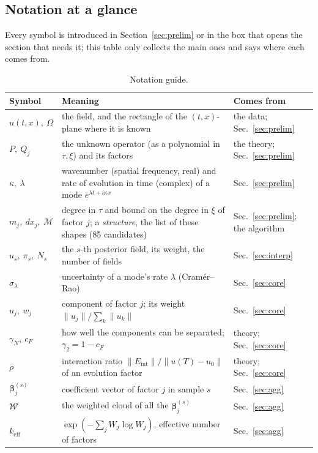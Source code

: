 \documentclass[11pt,a4paper]{article}
\theoremstyle{definition}
\newcommand{\Eint}{E_{\mathrm{int}}}
\newcommand{\bs}{\boldsymbol}
\begin{document}
\subsection{Notation at a glance}
Every symbol is introduced in Section~\ref{sec:prelim} or in the box that opens the section that needs it; this table only collects the main ones and says where each comes from.
\begin{table}[!htb]
\centering\small
\begin{tabular}{@{}L{2.9cm}L{7.0cm}L{3.0cm}@{}}
\toprule
Symbol & Meaning & Comes from\\\midrule
$u(t,x),\ \Omega$ & the field, and the rectangle of the $(t,x)$-plane where it is known & the data; Sec.~\ref{sec:prelim}\\
$P,\ Q_j$ & the unknown operator (as a polynomial in $\tau,\xi$) and its factors & the theory; Sec.~\ref{sec:prelim}\\
$\kappa,\ \lambda$ & wavenumber (spatial frequency, real) and rate of evolution in time (complex) of a mode $e^{\lambda t+i\kappa x}$ & Sec.~\ref{sec:prelim}\\
$m_j,\ dx_j,\ \mathcal M$ & degree in $\tau$ and bound on the degree in $\xi$ of factor $j$; a \emph{structure}, the list of these shapes (85 candidates) & Sec.~\ref{sec:prelim}; the algorithm\\
$\hat u_s,\ \pi_s,\ N_s$ & the $s$-th posterior field, its weight, the number of fields & Sec.~\ref{sec:interp}\\
$\sigma_\lambda$ & uncertainty of a mode's rate $\lambda$ (Cram\'er--Rao) & Sec.~\ref{sec:core}\\
$u_j,\ w_j$ & component of factor $j$; its weight $\|u_j\|/\sum_k\|u_k\|$ & Sec.~\ref{sec:core}\\
$\gamma_N,\ c_F$ & how well the components can be separated; $\gamma_2=1-c_F$ & theory; Sec.~\ref{sec:core}\\
$\rho$ & interaction ratio $\|\Eint\|/\|u(T)-u_0\|$ of an evolution factor & theory; Sec.~\ref{sec:core}\\
$\bs\beta^{(s)}_j$ & coefficient vector of factor $j$ in sample $s$ & Sec.~\ref{sec:agg}\\
$\mathcal W$ & the weighted cloud of all the $\bs\beta^{(s)}_j$ & Sec.~\ref{sec:agg}\\
$k_{\mathrm{eff}}$ & $\exp(-\sum_jW_j\log W_j)$, effective number of factors & Sec.~\ref{sec:agg}\\
\bottomrule
\end{tabular}
\caption{Notation guide.}
\end{table}
\end{document}
